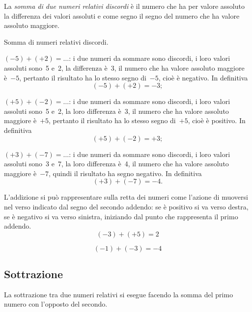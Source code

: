 La \emph{somma di due numeri relativi discordi} è il numero che ha per valore assoluto la differenza dei valori assoluti
e come segno il segno del numero che ha valore assoluto maggiore.

\begin{exrig}
 \begin{esempio} Somma di numeri relativi discordi.
  \begin{itemize*}
  \item $(-5)+(+2)=\ldots$: i due numeri da sommare sono discordi, i loro valori assoluti sono~5 e~2, la differenza è~3,
  il numero che ha valore assoluto maggiore è~$-5$, pertanto il risultato ha lo stesso segno di~$-5$, cioè è negativo.
  In definitiva \[(-5)+(+2)=-3;\]
  \item $(+5)+(-2)=\ldots$: i due numeri da sommare sono discordi, i loro valori assoluti sono~5 e~2, la loro differenza è~3,
  il numero che ha valore assoluto maggiore è~$+5$, pertanto il risultato ha lo stesso segno di~$+5$,
  cioè è positivo. In definitiva \[(+5)+(-2)=+3;\]
  \item $(+3)+(-7)=\ldots$: i due numeri da sommare sono discordi, i loro valori assoluti sono~3 e~7, la loro differenza è~4,
  il numero che ha valore assoluto maggiore è~$-7$, quindi il risultato ha segno negativo.
  In definitiva \[(+3)+(-7)=-4.\]
  \end{itemize*}
 \end{esempio}
\end{exrig}

L'addizione si può rappresentare sulla retta dei numeri come l'azione di muoversi nel verso indicato dal segno del
secondo addendo: se è positivo si va verso destra, se è negativo si va verso sinistra, iniziando dal punto che
rappresenta il primo addendo.
 \[(-3)+(+5)=2\]
\begin{center}
 
\end{center}

\[ (-1)+(-3) = -4\]
\begin{center}
 
\end{center}

\ovalbox{\risolvii \ref{ese:2.6}, \ref{ese:2.7}, \ref{ese:2.8}}
\subsection{Sottrazione}

La sottrazione tra due numeri relativi si esegue facendo la somma del primo numero con l'opposto del secondo.

